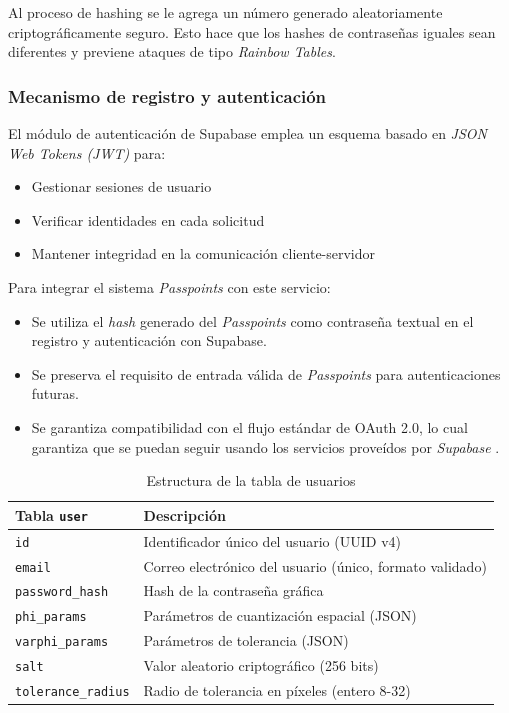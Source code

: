 Al proceso de hashing se le agrega un n\'umero generado aleatoriamente criptogr\'aficamente seguro. Esto hace que los hashes de contrase\~nas iguales sean diferentes y previene ataques de tipo \textit{Rainbow Tables}.

\subsubsection{Mecanismo de registro y autenticaci\'on}
El módulo de autenticación de Supabase emplea un esquema basado en \textit{JSON Web Tokens (JWT)} para:
\begin{itemize}
	\item Gestionar sesiones de usuario
	\item Verificar identidades en cada solicitud
	\item Mantener integridad en la comunicación cliente-servidor
\end{itemize}

Para integrar el sistema \textit{Passpoints} con este servicio:
\begin{itemize}
	\item Se utiliza el \textit{hash} generado del \textit{Passpoints} como contraseña textual en el registro y autenticaci\'on con Supabase.
	\item Se preserva el requisito de entrada válida de \textit{Passpoints} para autenticaciones futuras.
	\item Se garantiza compatibilidad con el flujo estándar de OAuth 2.0, lo cual garantiza que se puedan seguir usando los servicios prove\'idos por \textit{Supabase} \cite{supabase}.
\end{itemize}


\begin{table}[ht]
	\centering
	\caption{Estructura de la tabla de usuarios}
	\label{tab:bd-esquema}
	\begin{tabularx}{\textwidth}{lX}
		\toprule
		\textbf{Tabla \texttt{user}} & \textbf{Descripción} \\
		\midrule
		\texttt{id} & Identificador único del usuario (UUID v4) \\
		\texttt{email} & Correo electrónico del usuario (único, formato validado) \\
		\texttt{password\_hash} & Hash de la contraseña gráfica \\
		\texttt{phi\_params} & Parámetros de cuantización espacial (JSON) \\
		\texttt{varphi\_params} & Parámetros de tolerancia (JSON) \\
		\texttt{salt} & Valor aleatorio criptográfico (256 bits) \\
		\texttt{tolerance\_radius} & Radio de tolerancia en píxeles (entero 8-32) \\
	
		\bottomrule
	\end{tabularx}
\end{table}


